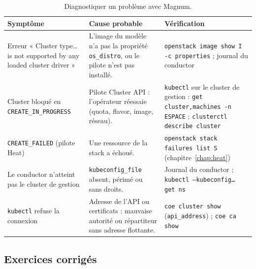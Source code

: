 \begin{table}[H]
\centering
\renewcommand{\arraystretch}{1.3}
\begin{tabular}{@{}>{\raggedright\arraybackslash}p{3.6cm}>{\raggedright\arraybackslash}p{6.4cm}>{\raggedright\arraybackslash}p{5.5cm}@{}}
\toprule
\textbf{Symptôme} & \textbf{Cause probable} & \textbf{Vérification} \\
\midrule
Erreur « Cluster type\dots{} is not supported by any loaded cluster driver » & L'image du modèle n'a pas la propriété \texttt{os\_distro}, ou le pilote n'est pas installé. & \texttt{openstack image show I -c properties} ; journal du conductor \\
Cluster bloqué en \texttt{CREATE\_IN\_PROGRESS} & Pilote Cluster API : l'opérateur réessaie (quota, flavor, image, réseau). & \texttt{kubectl} sur le cluster de gestion : \texttt{get cluster,machines -n ESPACE} ; \texttt{clusterctl describe cluster} \\
\texttt{CREATE\_FAILED} (pilote Heat) & Une ressource de la stack a échoué. & \texttt{openstack stack failures list S} (chapitre~\ref{chap:heat}) \\
Le conductor n'atteint pas le cluster de gestion & \texttt{kubeconfig\_file} absent, périmé ou sans droits. & Journal du conductor ; \texttt{kubectl --kubeconfig\dots{} get ns} \\
\texttt{kubectl} refuse la connexion & Adresse de l'API ou certificats : mauvaise autorité ou répartiteur sans adresse flottante. & \texttt{coe cluster show} (\texttt{api\_address}) ; \texttt{coe ca show} \\
\bottomrule
\end{tabular}
\caption{Diagnostiquer un problème avec Magnum.}
\label{tab:ma-pannes}
\end{table}

\clearpage
\subsection{Exercices corrigés}\label{sec:ma-exercices}


